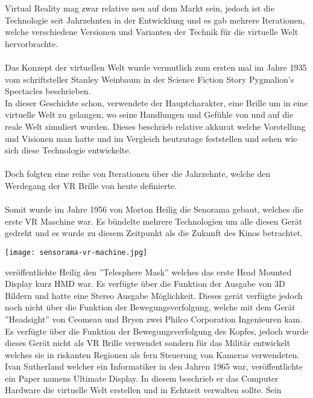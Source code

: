 
Virtual Reality mag zwar relative neu auf dem Markt sein, jedoch ist die Technologie seit Jahrzehnten in der Entwicklung und es gab mehrere
Iterationen, welche verschiedene Versionen und Varianten der Technik für die virtuelle Welt hervorbrachte. \\ \\
Das Konzept der virtuellen Welt wurde vermutlich zum ersten mal im Jahre 1935 vom schriftsteller Stanley Weinbaum in der Science Fiction
Story Pygmalion's Spectacles beschrieben.\\ 
In dieser Geschichte schon, verwendete der Hauptcharakter, eine Brille um in eine virtuelle Welt zu gelangen, wo seine Handlungen
und Gefühle von und auf die reale Welt simuliert wurden. Dieses beschrieb relative akkurat welche Vorstellung und Visionen man hatte und im
Vergleich heutzutage feststellen und sehen wie sich diese Technologie entwickelte.\cite{virtualrealityhistory}\\ \\
Doch folgten eine reihe von Iterationen über die Jahrzehnte, welche den Werdegang der VR Brille von heute definierte. \\ \\
Somit wurde im Jahre 1956 von Morton Heilig die Senorama gebaut, welches die erste VR Maschine war. Es bündelte mehrere Technologien um alle
diesen Gerät gedreht und es wurde zu diesem Zeitpunkt als die Zukunft des Kinos betrachtet.\cite{virtualrealityhistory} \\
\begin{center}
    \texttt{[image: sensorama-vr-machine.jpg]}
\end{center}
\newpage {} veröffentlichte Heilig den ''Telesphere Mask'' welches das erste Head Mounted Display kurz HMD war. Es verfügte über die
Funktion der Ausgabe von 3D Bildern und hatte eine Stereo Ausgabe Möglichkeit. Dieses gerät verfügte jedoch noch nicht über die Funktion der
Bewegungsverfolgung, welche mit dem Gerät ''Headsight'' von Ceomeau und Bryen zwei Philco Corporation Ingenieuren kam. Es
verfügte über die Funktion der Bewegungsverfolgung des Kopfes, jedoch wurde dieses Gerät nicht als VR Brille verwendet sondern für das
Militär entwickelt welches sie in riskanten Regionen als fern Steuerung von Kameras verwendeten.\cite{virtualrealityhistory}\\
Ivan Sutherland welcher ein Informatiker in den Jahren 1965 war, veröffentlichte ein Paper namens Ultimate Display. In diesem beschrieb er
das Computer Hardware die virtuelle Welt erstellen und in Echtzeit verwalten sollte. Sein
